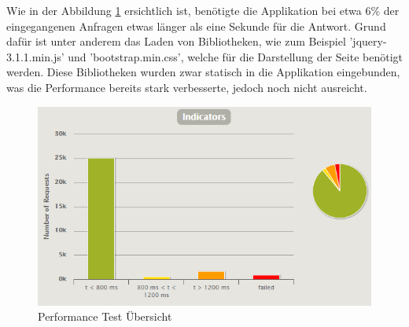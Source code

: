 Wie in der Abbildung \ref{performance_tests} ersichtlich ist, benötigte die Applikation bei etwa 6\% der eingegangenen Anfragen etwas länger als eine Sekunde für die Antwort. Grund dafür ist unter anderem das Laden von Bibliotheken, wie zum Beispiel 'jquery-3.1.1.min.js' und 'bootstrap.min.css', welche für die Darstellung der Seite benötigt werden. Diese Bibliotheken wurden zwar statisch in die Applikation eingebunden, was die Performance bereits stark verbesserte, jedoch noch nicht ausreicht. 

	\begin{figure}[H]
		\includegraphics[width=\textwidth, height=\textheight, keepaspectratio]{images/performance_uebersicht.png}
		\caption{Performance Test Übersicht}
			\label{performance_tests}
	\end{figure}


